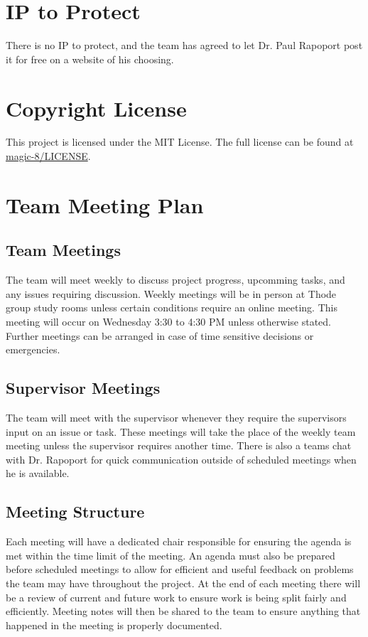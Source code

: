 \documentclass{article}
\begin{document}
\section{IP to Protect}

There is no IP to protect, and the team has agreed to let Dr. Paul Rapoport post it for free on a website of his choosing.

\section{Copyright License}

This project is licensed under the MIT License. The full license can be found at \href{https://github.com/Jacob-MB/magic-8/blob/main/LICENSE}{magic-8/LICENSE}.

\section{Team Meeting Plan}

\subsection{Team Meetings}

The team will meet weekly to discuss project progress, upcomming tasks, and any issues requiring discussion.
Weekly meetings will be in person at Thode group study rooms unless certain conditions require an online meeting.
This meeting will occur on Wednesday 3:30 to 4:30 PM unless otherwise stated. Further meetings can be arranged in case of time sensitive decisions or emergencies.

\subsection{Supervisor Meetings}

The team will meet with the supervisor whenever they require the supervisors input on an issue or task.
These meetings will take the place of the weekly team meeting unless the supervisor requires another time.
There is also a teams chat with Dr. Rapoport for quick communication outside of scheduled meetings when he is available.

\subsection{Meeting Structure}

Each meeting will have a dedicated chair responsible for ensuring the agenda is met within the time limit of the meeting.
An agenda must also be prepared before scheduled meetings to allow for efficient and useful feedback on problems the team may have throughout the project.
At the end of each meeting there will be a review of current and future work to ensure work is being split fairly and efficiently.
Meeting notes will then be shared to the team to ensure anything that happened in the meeting is properly documented.
\end{document}
